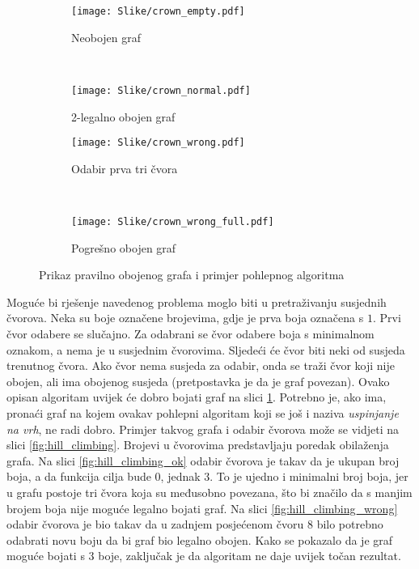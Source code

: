 \documentclass[times, utf8, diplomski, numeric]{fer}
\begin{document}
\begin{figure}
        \centering
        \begin{subfigure}[b]{0.33\textwidth}
                \texttt{[image: Slike/crown\_empty.pdf]}
                \caption{Neobojen graf}
                \label{fig:crown_empty}
        \end{subfigure}
        ~
        \begin{subfigure}[b]{0.33\textwidth}
                \texttt{[image: Slike/crown\_normal.pdf]}
                \caption{2-legalno obojen graf}
                \label{fig:crown_normal}
        \end{subfigure}
         
        \begin{subfigure}[b]{0.33\textwidth}
                \texttt{[image: Slike/crown\_wrong.pdf]}
                \caption{Odabir prva tri čvora}
                \label{fig:crown_wrong}
        \end{subfigure}
        ~
        \begin{subfigure}[b]{0.33\textwidth}
                \texttt{[image: Slike/crown\_wrong\_full.pdf]}
                \caption{Pogrešno obojen graf}
                \label{fig:crown_wrong_full}
        \end{subfigure}
        \caption{Prikaz pravilno obojenog grafa i primjer pohlepnog algoritma}
        \label{fig:greedy_alg}
\end{figure}


Moguće bi rješenje navedenog problema moglo biti u pretraživanju susjednih čvorova. Neka su boje označene brojevima, gdje je prva boja označena s $1$. Prvi čvor odabere se slučajno. Za odabrani se čvor odabere boja s minimalnom oznakom, a nema je u susjednim čvorovima. Sljedeći će čvor biti neki od susjeda trenutnog čvora. Ako čvor nema susjeda za odabir, onda se traži čvor koji nije obojen, ali ima obojenog susjeda (pretpostavka je da je graf povezan). Ovako opisan algoritam uvijek će dobro bojati graf na slici \ref{fig:crown_empty}. Potrebno je, ako ima, pronaći graf na kojem ovakav pohlepni algoritam koji se još i naziva \emph{uspinjanje na vrh}, ne radi dobro. Primjer takvog grafa i odabir čvorova može se vidjeti na slici \ref{fig:hill_climbing}. Brojevi u čvorovima predstavljaju poredak obilaženja grafa. Na slici \ref{fig:hill_climbing_ok} odabir čvorova je takav da je ukupan broj boja, a da funkcija cilja bude $0$, jednak $3$. To je ujedno i minimalni broj boja, jer u grafu postoje tri čvora koja su međusobno povezana, što bi značilo da s manjim brojem boja nije moguće legalno bojati graf. Na slici \ref{fig:hill_climbing_wrong} odabir čvorova je bio takav da u zadnjem posjećenom čvoru $8$ bilo potrebno odabrati novu boju da bi graf bio legalno obojen. Kako se pokazalo da je graf moguće bojati s $3$ boje, zaključak je da algoritam ne daje uvijek točan rezultat.
\end{document}
